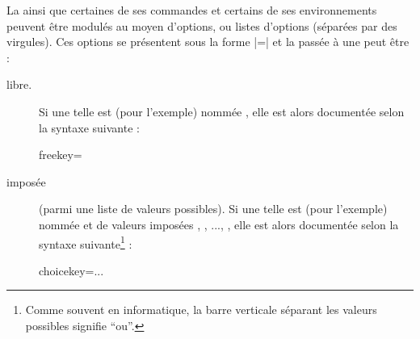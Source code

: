 La \yatCl{} ainsi que certaines de ses commandes et certains de ses
environnements peuvent être modulés au moyen d'options, ou listes d'options
(séparées par des virgules). Ces options se présentent sous la forme
|=| et la  passée à une  peut
être :
\begin{description}
\item[libre.] Si une telle  est (pour l'exemple) nommée
  , elle est alors documentée selon la syntaxe suivante :
  \begin{docKey*}{freekey}{=}{}
  \end{docKey*}
\item[imposée] (parmi une liste de valeurs possibles). Si une telle  est
   (pour l'exemple) nommée  et de valeurs imposées
  , , ..., , elle est alors
  documentée selon la syntaxe suivante\footnote{Comme souvent en informatique,
    la barre verticale séparant les valeurs possibles signifie \enquote{ou}.} :
  \begin{docKey*}{choicekey}{=\textbar{}\textbar...\textbar{}}{}
  \end{docKey*}
\end{description}

